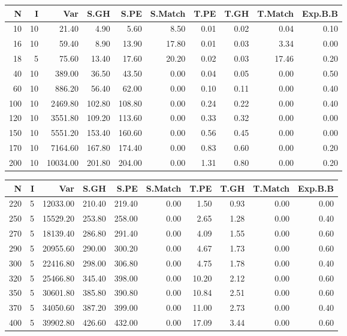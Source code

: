 \documentclass[twoside,a4paper,openright,12pt,tikz]{book}
\begin{document}
\begin{table}[ht]
\centering
\begin{tabular}{rrrrrrrrrr}
  \hline
N & I & Var & S.GH & S.PE & S.Match & T.PE & T.GH & T.Match & Exp.B.B \\ 
  \hline
10 & 10 & 21.40 & 4.90 & 5.60 & 8.50 &   0.01 & 0.02 & 0.04 & 0.10 \\ 
16 & 10 & 59.40 & 8.90 & 13.90 & 17.80 & 0.01 & 0.03 & 3.34 & 0.00 \\ 
18 &  5 & 75.60 & 13.40 & 17.60 & 20.20& 0.02 & 0.03 & 17.46 & 0.20 \\ 
 \hline
40 & 10 & 389.00 & 36.50& 43.50 & 0.00 & 0.04 & 0.05 & 0.00 & 0.50 \\ 
60 & 10 & 886.20 & 56.40& 62.00 & 0.00 & 0.10 & 0.11 & 0.00 & 0.40 \\ 
100 & 10 & 2469.80 & 102.80 & 108.80 & 0.00 & 0.24 & 0.22 & 0.00 & 0.40 \\ 
120 &   10 & 3551.80 & 109.20 & 113.60 & 0.00 & 0.33 & 0.32 & 0.00 & 0.00 \\ 
150 &   10 & 5551.20 & 153.40 & 160.60 & 0.00 & 0.56 & 0.45 & 0.00 & 0.00 \\ 
170 &   10 & 7164.60 & 167.80 & 174.40 & 0.00 & 0.83 & 0.60 & 0.00 & 0.20 \\ 
200 &   10 & 10034.00 & 201.80 & 204.00 & 0.00 & 1.31 & 0.80 & 0.00 & 0.20 \\ 
  \hline
 \end{tabular}
 \end{table}
\begin{table}[h]
\centering
\begin{tabular}{rrrrrrrrrr}
  \hline
N & I & Var & S.GH & S.PE & S.Match & T.PE & T.GH & T.Match & Exp.B.B \\ 
  \hline 
  220 &   5 & 12033.00 & 210.40 & 219.40 & 0.00 & 1.50 & 0.93 & 0.00 & 0.00 \\ 
  250 &   5 & 15529.20 & 253.80 & 258.00 & 0.00 & 2.65 & 1.28 & 0.00 & 0.40 \\ 
  270 &   5 & 18139.40 & 286.80 & 291.40 & 0.00 & 4.09 & 1.55 & 0.00 & 0.60 \\ 
290 &     5 & 20955.60 & 290.00 & 300.20 & 0.00 & 4.67 & 1.73 & 0.00 & 0.60 \\ 
  300 &   5 & 22416.80 & 298.00 & 306.80 & 0.00 & 4.75 & 1.78 & 0.00 & 0.40 \\ 
320 &   5   & 25466.80 & 345.40 & 398.00 & 0.00 & 10.20 & 2.12 & 0.00 & 0.60\\
  350 &   5 & 30601.80 & 385.80 & 390.80 & 0.00 & 10.84 & 2.51 & 0.00 & 0.60\\
  370 &   5 & 34050.60 & 387.20 & 399.00 & 0.00 & 11.00 & 2.73 & 0.00 & 0.40\\
  400 &   5 & 39902.80 & 426.60 & 432.00 & 0.00 & 17.09 & 3.44 & 0.00 & 0.60 \\ 
   \hline
 
\end{tabular}
\end{table}
\end{document}
